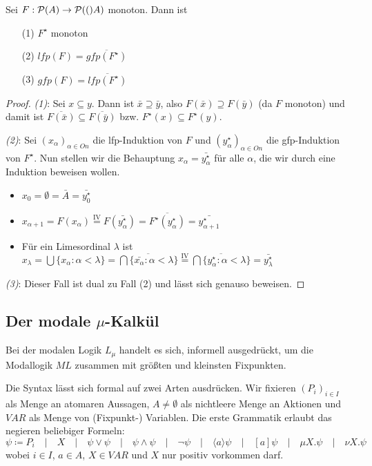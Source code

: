 \begin{satz}
	Sei $F:\mathcal{P}(A)\to\mathcal{P}(()A)$ monoton. Dann ist
	\begin{itemize}
		\item[(1)] $F^\star$ monoton
		\item[(2)] $lfp(F)=\overline{gfp(F^\star)}$
		\item[(3)] $gfp(F)=\overline{lfp(F^\star)}$
	\end{itemize}
\end{satz}
\begin{proof}
	\textit{(1)}: Sei $x\subseteq y$. Dann ist $\bar{x}\supseteq\bar{y}$, also $F(\bar{x})\supseteq F(\bar{y})$ (da $F$ monoton) und damit ist $\overline{F(\bar{x})}\subseteq\overline{F(\bar{y})}$ bzw. $F^\star(x)\subseteq F^\star(y)$.
	
	\textit{(2)}: Sei $(x_\alpha)_{\alpha\in On}$ die lfp-Induktion von $F$ und $(y^\star_\alpha)_{\alpha\in On}$ die gfp-Induktion von $F^\star$. Nun stellen wir die Behauptung $x_\alpha=\bar{y^\star_\alpha}$ für alle $\alpha$, die wir durch eine Induktion beweisen wollen.
	\begin{itemize}
		\item $x_0=\emptyset=\bar{A}=\bar{y^\star_0}$
		\item $x_{\alpha+1}=F(x_\alpha) \overset{\text{IV}}{=} F(\bar{y^\star_\alpha})= \overline{F^\star(y^\star_\alpha)} = \bar{y^\star_{\alpha+1}}$
		\item Für ein Limesordinal $\lambda$ ist $x_\lambda=\bigcup\{x_\alpha:\alpha<\lambda\} = \overline{\bigcap \{\bar{x_\alpha} : \alpha < \lambda\}} \overset{\text{IV}}{=} \overline{\bigcap\{y^\star_\alpha : \alpha<\lambda\}}= \bar{y^\star_\lambda}$
	\end{itemize}
	
	\textit{(3)}: Dieser Fall ist dual zu Fall (2) und lässt sich genauso beweisen.
\end{proof}


\subsection{Der modale $\mu$-Kalkül}

Bei der modalen Logik $L_\mu$ handelt es sich, informell ausgedrückt, um die Modallogik $ML$ zusammen mit größten und kleinsten Fixpunkten.

Die Syntax lässt sich formal auf zwei Arten ausdrücken. Wir fixieren $(P_i)_{i\in I}$ als Menge an atomaren Aussagen, $A\neq\emptyset$ als nichtleere Menge an Aktionen und $VAR$ als Menge von (Fixpunkt-) Variablen.
 Die erste Grammatik erlaubt das negieren beliebiger Formeln:
 \[\psi \coloneqq P_i \quad\vert\quad X \quad\vert\quad \psi\lor \psi \quad\vert\quad \psi \land \psi \quad\vert\quad \neg\psi \quad\vert\quad \langle a \rangle \psi \quad\vert\quad [a]\psi \quad\vert\quad \mu X.\psi \quad\vert\quad \nu X.\psi\]
 wobei $i\in I$, $a\in A$, $X\in VAR$ und $X$ nur positiv vorkommen darf.
 
